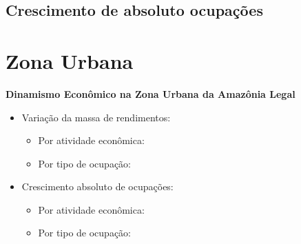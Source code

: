 \documentclass[8pt]{beamer}
\begin{document}
\subsection{Crescimento de absoluto ocupações}

\begin{frame}
\textit{\hyperlink{indice_principal_amz_rural}{}}

\end{frame}

\begin{frame}
\textit{\hyperlink{indice_principal_amz_rural}{}}

\end{frame}

\section{Zona Urbana}

\begin{frame}[label=indice_principal_amz_urbana]{}

\textit{\hyperlink{indice_principal}{}}

\textbf{Dinamismo Econômico na Zona Urbana da Amazônia Legal}
\vspace{2mm}

\begin{itemize}

\item{Variação da massa de rendimentos:
	\begin{itemize}
	\item{Por atividade econômica: \hyperlink{amzurbanarkngvmassaporcnae2dig}{}}
	\item{Por tipo de ocupação: \hyperlink{amzurbanarkngvmassaporcod2dig}{}}
	\end{itemize}
}
\vspace{1mm}

\item{Crescimento  absoluto de ocupações:
	\begin{itemize}
	\item{Por atividade econômica: \hyperlink{amzurbanarkngnocuporcnae2dig}{}}
	\item{Por tipo de ocupação: \hyperlink{amzurbanarkngnocuporcod2dig}{}}
	\end{itemize}
}
\vspace{1mm}

\end{itemize}

\end{frame}
\end{document}
